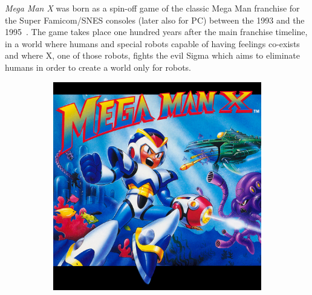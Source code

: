 
\textit{Mega Man X} was born as a spin-off game of the classic Mega Man franchise for the Super Famicom/SNES consoles (later also for PC)  between the 1993 and the 1995~\cite{wiki:MMX}. The game takes place one hundred years after the main franchise timeline, in a world where humans and special robots capable of having feelings co-exists and where X, one of those robots, fights the evil Sigma which aims to eliminate humans in order to create a world only for robots.
\begin{figure}[htp]
	\centering
	\begin{subfigure}{0.4\linewidth}
		\centering
		\includegraphics[width=\linewidth]{figures/X1/mmx_cover.jpeg}
	\end{subfigure}
	\begin{subfigure}{0.4\linewidth}
		\centering

\end{subfigure}
\end{figure}
